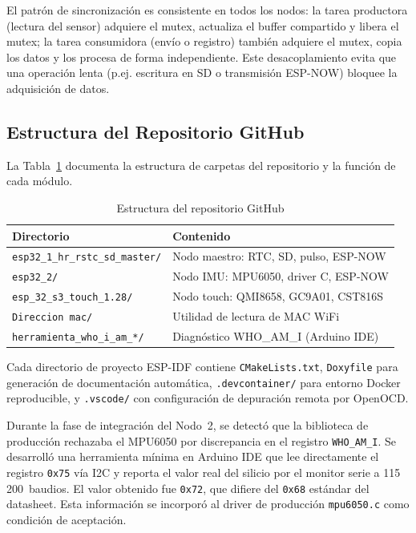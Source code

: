 \documentclass[10pt,twocolumn,a4paper]{article}
\begin{document}
El patrón de sincronización es consistente en todos los nodos: la tarea
productora (lectura del sensor) adquiere el mutex, actualiza el buffer
compartido y libera el mutex; la tarea consumidora (envío o registro)
también adquiere el mutex, copia los datos y los procesa de forma
independiente. Este desacoplamiento evita que una operación lenta (p.ej.
escritura en SD o transmisión ESP-NOW) bloquee la adquisición de datos.

\subsection{Estructura del Repositorio GitHub}

La Tabla~\ref{tab:repo} documenta la estructura de carpetas del
repositorio y la función de cada módulo.

\begin{table}[H]
\centering
\caption{Estructura del repositorio GitHub}
\label{tab:repo}
\scriptsize
\begin{tabular}{p{3.0cm}p{3.7cm}}
\toprule
\textbf{Directorio} & \textbf{Contenido} \\
\midrule
\texttt{esp32\_1\_hr\_rstc\_sd\_master/} & Nodo maestro: RTC, SD, pulso, ESP-NOW \\
\texttt{esp32\_2/} & Nodo IMU: MPU6050, driver C, ESP-NOW \\
\texttt{esp\_32\_s3\_touch\_1.28/} & Nodo touch: QMI8658, GC9A01, CST816S \\
\texttt{Direccion mac/} & Utilidad de lectura de MAC WiFi \\
\texttt{herramienta\_who\_i\_am\_*/} & Diagnóstico WHO\_AM\_I (Arduino IDE) \\
\bottomrule
\end{tabular}
\end{table}

Cada directorio de proyecto ESP-IDF contiene \texttt{CMakeLists.txt},
\texttt{Doxyfile} para generación de documentación automática,
\texttt{.devcontainer/} para entorno Docker reproducible,
y \texttt{.vscode/} con configuración de depuración remota por OpenOCD.
\label{sec:who}

Durante la fase de integración del Nodo~2, se detectó que la biblioteca
de producción rechazaba el MPU6050 por discrepancia en el registro
\texttt{WHO\_AM\_I}. Se desarrolló una herramienta mínima en Arduino
IDE que lee directamente el registro \texttt{0x75} vía I2C y reporta
el valor real del silicio por el monitor serie a 115\,200~baudios. El
valor obtenido fue \texttt{0x72}, que difiere del \texttt{0x68}
estándar del datasheet. Esta información se incorporó al driver de
producción \texttt{mpu6050.c} como condición de aceptación.
\end{document}
